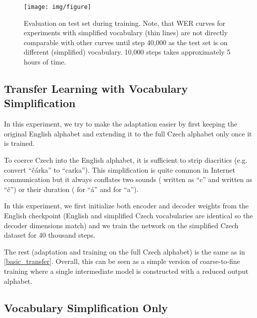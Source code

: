 \begin{landscape}
\begin{figure}[t]
\texttt{[image: img/figure]}
\caption{Evaluation on test set during training. %
Note, that WER curves for experiments with simplified vocabulary (thin lines) are not directly comparable with other curves until step 40,000 as the test set is on different (simplified) vocabulary. 10,000 steps takes approximately 5 hours of time.}
\label{fig:training}
\end{figure}
\end{landscape}

\subsection{Transfer Learning with Vocabulary Simplification}

In this experiment, we try to make the adaptation easier by first keeping the original English alphabet and extending it to the full Czech alphabet only once it is trained.

To coerce Czech into the English alphabet, it is sufficient to strip diacritics (e.g. convert ``\v{c}\'arka'' to ``carka''). This simplification is quite common in Internet communication but it always conflates two sounds (\textipa{[ts]} written as ``c'' and \textipa{[tS]} written as ``\v{c}'')  or their duration (\textipa{[a:]} for ``\'a'' and \textipa{[a]} for ``a'').

In this experiment, we first initialize both encoder and decoder weights from the English checkpoint (English and simplified Czech vocabularies are identical so the decoder dimensions match) and we train the network on the simplified Czech dataset for 40 thousand steps.

The rest (adaptation and training on the full Czech alphabet)
is the same as in \cref{basic_transfer}.
%
Overall, this can be seen as a simple version of coarse-to-fine training where a single intermediate model is constructed with a reduced output alphabet.

\subsection{Vocabulary Simplification Only}
\label{sub_sec:simplification}


